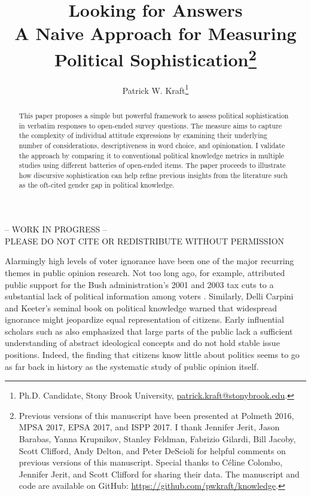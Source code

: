 \documentclass[12pt]{article}
\author{Patrick W. Kraft\footnote{Ph.D. Candidate, Stony Brook University, \href{mailto:patrick.kraft@stonybrook.edu}{patrick.kraft@stonybrook.edu}.
}}
\title{Looking for Answers\\ %
\large{A Naive Approach for Measuring Political Sophistication}\footnote{Previous versions of this manuscript have been presented at Polmeth 2016, MPSA 2017, EPSA 2017, and ISPP 2017. I thank Jennifer Jerit, Jason Barabas, Yanna Krupnikov, Stanley Feldman, Fabrizio Gilardi, Bill Jacoby, Scott Clifford, Andy Delton, and Peter DeScioli for helpful comments on previous versions of this manuscript. Special thanks to C{\'e}line Colombo, Jennifer Jerit, and Scott Clifford for sharing their data. The manuscript and code are available on GitHub: \url{https://github.com/pwkraft/knowledge}. %
}
}
\date{}
\begin{document}
\maketitle
\doublespacing
\thispagestyle{empty}

\begin{center}
-- WORK IN PROGRESS -- \\
PLEASE DO NOT CITE OR REDISTRIBUTE WITHOUT PERMISSION
\end{center} 

\hfill
\begin{abstract}\singlespacing
This paper proposes a simple but powerful framework to assess political sophistication in verbatim responses to open-ended survey questions. The measure aims to capture the complexity of individual attitude expressions by examining their underlying number of considerations, descriptiveness in word choice, and opinionation. I validate the approach by comparing it to conventional political knowledge metrics in multiple studies using different batteries of open-ended items. The paper proceeds to illustrate how discursive sophistication can help refine previous insights from the literature such as the oft-cited gender gap in political knowledge.


\end{abstract}
\hfill
\newpage\setcounter{page}{1}



Alarmingly high levels of voter ignorance have been one of the major recurring themes in public opinion research. Not too long ago, for example, \citet{bartels2005homer} attributed public support for the Bush administration's 2001 and 2003 tax cuts to a substantial lack of political information among voters \citep[but see][]{lupia2007were,bartels2007homer}. Similarly, Delli Carpini and Keeter's \citeyearpar{carpini1996americans} seminal book on political knowledge warned that widespread ignorance might jeopardize equal representation of citizens. Early influential scholars such as \citet{converse1964nature} also emphasized that large parts of the public lack a sufficient understanding of abstract ideological concepts and do not hold stable issue positions. Indeed, the finding that citizens know little about politics seems to go as far back in history as the systematic study of public opinion itself.
\end{document}
